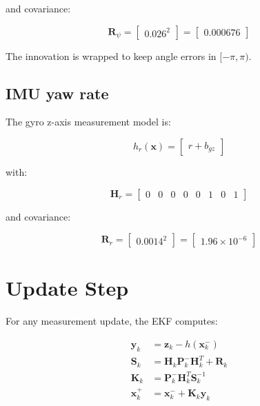 \documentclass[11pt]{article}
\newcommand{\vect}[1]{\boldsymbol{#1}}
\newcommand{\mat}[1]{\mathbf{#1}}
\begin{document}
and covariance:

\begin{equation}
\mat{R}_{\psi} =
\begin{bmatrix}
0.026^2
\end{bmatrix}
=
\begin{bmatrix}
0.000676
\end{bmatrix}
\end{equation}

The innovation is wrapped to keep angle errors in $[-\pi,\pi)$.

\subsection{IMU yaw rate}

The gyro z-axis measurement model is:

\begin{equation}
h_r(\vect{x}) =
\begin{bmatrix}
r + b_{gz}
\end{bmatrix}
\end{equation}

with:

\begin{equation}
\mat{H}_{r} =
\begin{bmatrix}
0 & 0 & 0 & 0 & 0 & 1 & 0 & 1
\end{bmatrix}
\end{equation}

and covariance:

\begin{equation}
\mat{R}_{r} =
\begin{bmatrix}
0.0014^2
\end{bmatrix}
=
\begin{bmatrix}
1.96\times 10^{-6}
\end{bmatrix}
\end{equation}

\section{Update Step}

For any measurement update, the EKF computes:

\begin{align}
\vect{y}_k &= \vect{z}_k - h(\vect{x}_k^-) \\
\mat{S}_k &= \mat{H}_k \mat{P}_k^- \mat{H}_k^T + \mat{R}_k \\
\mat{K}_k &= \mat{P}_k^- \mat{H}_k^T \mat{S}_k^{-1} \\
\vect{x}_k^+ &= \vect{x}_k^- + \mat{K}_k \vect{y}_k
\end{align}
\end{document}
